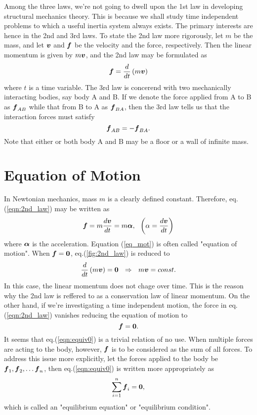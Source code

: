 \documentclass[10pt,a4j]{article}
\begin{document}
Among the three laws, we're not going to dwell upon the 1st law in developing 
structural mechanics theory. This is because we shall study time independent 
problems to which a useful inertia system always exists. 
The primary interests are hence in the 2nd and 3rd laws.  
To state the 2nd law more rigorously, let $m$ be the mass, and let $\mbox{\boldmath $v$}$ and $\mbox{\boldmath $f$}$ 
be the velocity and the force, respectively. Then the linear momentum is given 
by $m\mbox{\boldmath $v$}$, and the 2nd law may be formulated as 
\begin{equation}
	\mbox{\boldmath $f$}=\frac{d}{dt}\left(m\mbox{\boldmath $v$}\right)
	\label{eqn:2nd_law}
\end{equation}
where $t$ is a time variable. The 3rd law is concerend with two mechanically interacting bodies, 
say body A and B. If we denote the force applied from A to B as $\mbox{\boldmath $f$}_{AB}$ 
while that from B to A as $\mbox{\boldmath $f$}_{BA}$, then the 3rd law tells us that the 
interaction forces must satisfy  
\begin{equation}
	\mbox{\boldmath $f$}_{AB}=-\mbox{\boldmath $f$}_{BA}.
	\label{eqn:3rd_law}
\end{equation}
Note that either or both body A and B may be a floor or a wall of infinite mass. 
\section{Equation of Motion}
In Newtonian mechanics, mass $m$ is a clearly defined constant. 
Therefore, eq.(\ref{eqn:2nd_law}) may be written as 
\begin{equation}
	\fat{f}=m \frac{d\fat{v}}{dt}=m\fat{\alpha}, \ \ \left(\alpha=\frac{d\fat{v}}{dt}\right)
	\label{eqn:eq_mot}
\end{equation}
where $\mbox{\boldmath $\alpha$}$ is the acceleration. Equation (\ref{eq_mot}) is often called "equation of motion". 
When $\mbox{\boldmath $f$}=\mbox{\boldmath $0$}$, eq.(\ref{fig:2nd_law}) is reduced to 
\begin{equation}
	\frac{d}{dt}\left(m\fat{v}\right)=\fat{0} \ \ \Rightarrow \ \ 
	m\fat{v}=const.
	\label{eqn:mv_cnst}
\end{equation}
In this case, the linear momentum does not chage over time. 
This is the reason why the 2nd law is reffered to as a conservation law of linear momentum.
On the other hand, if we're investigating a time independent motion, 
the force in eq.(\ref{eqn:2nd_law}) vanishes reducing the equation 
of motion to 
\begin{equation}
	\mbox{\boldmath $f$}=\mbox{\boldmath $0$}.
	\label{eqn:equiv0}
\end{equation}
It seems that eq.(\ref{eqn:equiv0}) is a trivial relation of no use. 
When multiple forces are acting to the body, however, $\mbox{\boldmath $f$}$ is to be 
considered as the sum of all forces. To address this issue more explicitly, let the 
forces applied to the body be $\mbox{\boldmath $f$}_1, \mbox{\boldmath $f$}_2,\dots \mbox{\boldmath $f$}_n$, then 
eq.(\ref{eqn:equiv0}) is written more appropriately as 
\begin{equation}
	\sum_{i=1}^n\mbox{\boldmath $f$}_i=\mbox{\boldmath $0$},
	\label{eqn:equiv}
\end{equation}
which is called an "equilibrium equation" or "equilibrium condition". 
\end{document}
